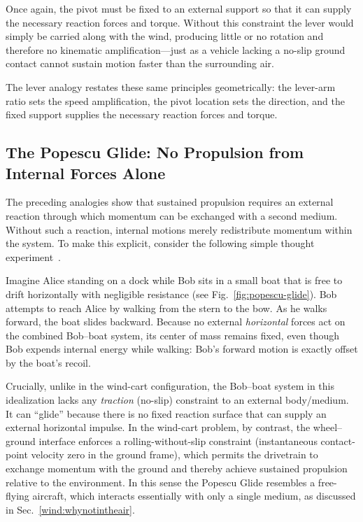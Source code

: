 \documentclass[a4paper]{article}
\begin{document}
Once again, the pivot must be fixed to an external support so that it can supply the necessary reaction forces and torque. Without this constraint the lever would simply be carried along with the wind, producing little or no rotation and therefore no kinematic amplification---just as a vehicle lacking a no-slip ground contact cannot sustain motion faster than the surrounding air.

The lever analogy restates these same principles geometrically: the lever-arm
ratio sets the speed amplification, the pivot location sets the direction, and
the fixed support supplies the necessary reaction forces and torque.

\subsection{The Popescu Glide: No Propulsion from Internal Forces Alone}

The preceding analogies show that sustained propulsion requires an external
reaction through which momentum can be exchanged with a second medium. Without
such a reaction, internal motions merely redistribute momentum within the
system. To make this explicit, consider the following simple thought
experiment~\cite{popescu_talk_2024}.

Imagine Alice standing on a dock while Bob sits in a small boat that is free to
drift horizontally with negligible resistance (see Fig.~\ref{fig:popescu-glide}). Bob attempts to reach Alice by
walking from the stern to the bow. As he walks forward, the boat slides
backward. Because no external \emph{horizontal} forces act on the combined
Bob--boat system, its center of mass remains fixed, even though Bob expends internal energy while walking: Bob's forward motion is
exactly offset by the boat's recoil.

Crucially, unlike in the wind-cart configuration, the Bob--boat system in this
idealization lacks any \emph{traction} (no-slip) constraint to an external
body/medium. It can ``glide'' because there is no fixed reaction surface that
can supply an external horizontal impulse. In the wind-cart problem, by
contrast, the wheel--ground interface enforces a rolling-without-slip
constraint (instantaneous contact-point velocity zero in the ground frame),
which permits the drivetrain to exchange momentum with the ground and thereby
achieve sustained propulsion relative to the environment. In this sense the
Popescu Glide resembles a free-flying aircraft, which interacts essentially
with only a single medium, as discussed in Sec.~\ref{wind:whynotintheair}.
\end{document}
